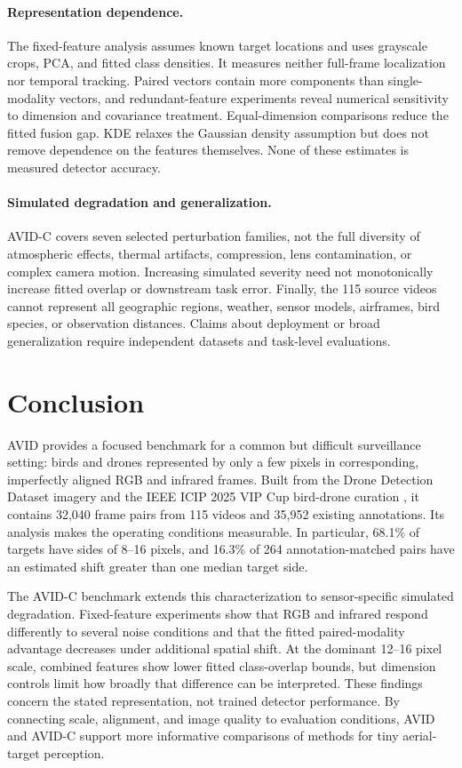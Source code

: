 \documentclass[10pt]{article}
\newcommand{\dataset}{\textsc{AVID}}
\newcommand{\corrupt}{\textsc{AVID-C}}
\begin{document}
\paragraph{Representation dependence.}
The fixed-feature analysis assumes known target locations and uses grayscale crops, PCA, and fitted class densities. It measures neither full-frame localization nor temporal tracking. Paired vectors contain more components than single-modality vectors, and redundant-feature experiments reveal numerical sensitivity to dimension and covariance treatment. Equal-dimension comparisons reduce the fitted fusion gap. KDE relaxes the Gaussian density assumption but does not remove dependence on the features themselves. None of these estimates is measured detector accuracy.

\paragraph{Simulated degradation and generalization.}
\corrupt{} covers seven selected perturbation families, not the full diversity of atmospheric effects, thermal artifacts, compression, lens contamination, or complex camera motion. Increasing simulated severity need not monotonically increase fitted overlap or downstream task error. Finally, the 115 source videos cannot represent all geographic regions, weather, sensor models, airframes, bird species, or observation distances. Claims about deployment or broad generalization require independent datasets and task-level evaluations.

\section{Conclusion}

\dataset{} provides a focused benchmark for a common but difficult surveillance setting: birds and drones represented by only a few pixels in corresponding, imperfectly aligned RGB and infrared frames. Built from the Drone Detection Dataset imagery and the IEEE ICIP 2025 VIP Cup bird-drone curation \citep{svanstrom2021multisensor}, it contains 32,040 frame pairs from 115 videos and 35,952 existing annotations. Its analysis makes the operating conditions measurable. In particular, 68.1\% of targets have sides of 8--16 pixels, and 16.3\% of 264 annotation-matched pairs have an estimated shift greater than one median target side.

The \corrupt{} benchmark extends this characterization to sensor-specific simulated degradation. Fixed-feature experiments show that RGB and infrared respond differently to several noise conditions and that the fitted paired-modality advantage decreases under additional spatial shift. At the dominant 12--16 pixel scale, combined features show lower fitted class-overlap bounds, but dimension controls limit how broadly that difference can be interpreted. These findings concern the stated representation, not trained detector performance. By connecting scale, alignment, and image quality to evaluation conditions, \dataset{} and \corrupt{} support more informative comparisons of methods for tiny aerial-target perception.
\end{document}
